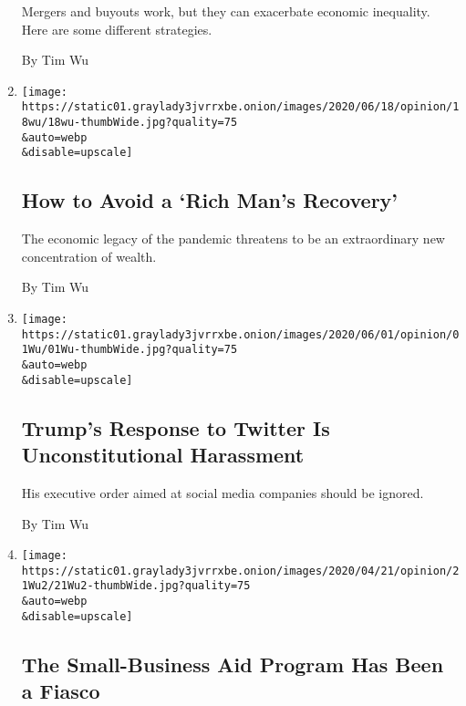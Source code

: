\begin{enumerate}
  Mergers and buyouts work, but they can exacerbate economic inequality.
  Here are some different strategies.

  By Tim Wu
\item
  \href{/2020/06/18/opinion/covid-economic-recovery-inequality.html}{}

  \texttt{[image: https://static01.graylady3jvrrxbe.onion/images/2020/06/18/opinion/18wu/18wu-thumbWide.jpg?quality=75\\\&auto=webp\\\&disable=upscale]}

  \hypertarget{how-to-avoid-a-rich-mans-recovery}{%
  \subsection{How to Avoid a `Rich Man's
  Recovery'}\label{how-to-avoid-a-rich-mans-recovery}}

  The economic legacy of the pandemic threatens to be an extraordinary
  new concentration of wealth.

  By Tim Wu
\item
  \href{/2020/06/02/opinion/trump-twitter-executive-order.html}{}

  \texttt{[image: https://static01.graylady3jvrrxbe.onion/images/2020/06/01/opinion/01Wu/01Wu-thumbWide.jpg?quality=75\\\&auto=webp\\\&disable=upscale]}

  \hypertarget{trumps-response-to-twitter-is-unconstitutional-harassment}{%
  \subsection{Trump's Response to Twitter Is Unconstitutional
  Harassment}\label{trumps-response-to-twitter-is-unconstitutional-harassment}}

  His executive order aimed at social media companies should be ignored.

  By Tim Wu
\item
  \href{/2020/04/21/opinion/paycheck-protection-program.html}{}

  \texttt{[image: https://static01.graylady3jvrrxbe.onion/images/2020/04/21/opinion/21Wu2/21Wu2-thumbWide.jpg?quality=75\\\&auto=webp\\\&disable=upscale]}

  \hypertarget{the-small-business-aid-program-has-been-a-fiasco}{%
  \subsection{The Small-Business Aid Program Has Been a
  Fiasco}\label{the-small-business-aid-program-has-been-a-fiasco}}


\end{enumerate}
